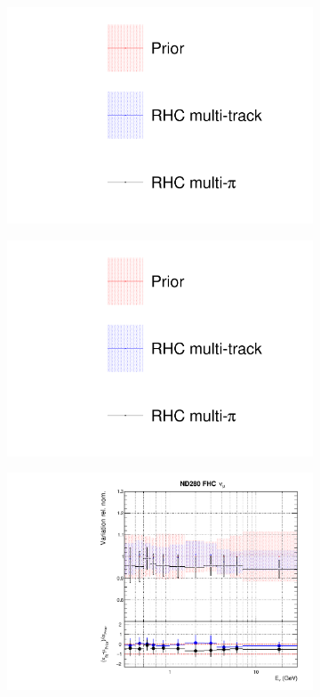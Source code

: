 \begin{figure}[t]
\centering
\begin{subfigure}{0.3\textwidth}
  \centering
  \includegraphics[width=1.0\linewidth, trim={5mm  130mm 0mm 10mm}, clip]{figs/rhcmpdat248_leg}	
\end{subfigure}
\begin{subfigure}{0.3\textwidth}
  \centering
  \includegraphics[width=1.0\linewidth, trim={5mm  0mm 0mm 70mm}, clip]{figs/rhcmpdat248_leg}	
\end{subfigure}
\begin{subfigure}{0.42\textwidth}
  \centering
  \includegraphics[width=0.75\linewidth]{figs/rhcmpasmvflux0}

\end{subfigure}
\end{figure}
